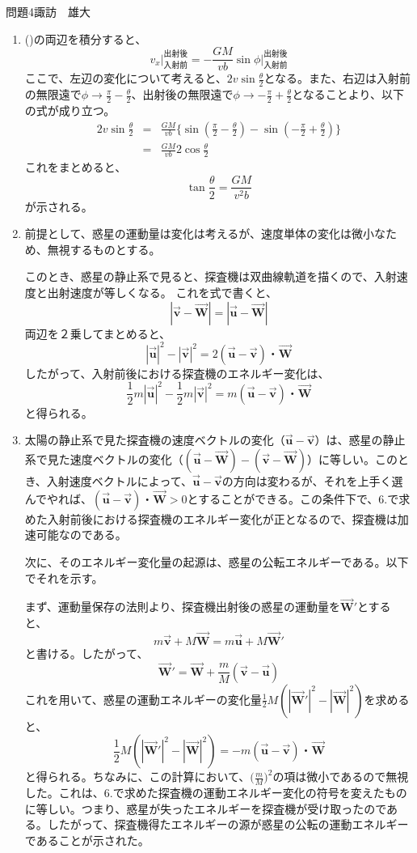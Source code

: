 \documentclass[fleqn]{jbook}
\newcommand{\W}{\vec{\mathbf{W}}} %
\newcommand{\vu}{\vec{\mathbf{u}}} %
\newcommand{\vv}{\vec{\mathbf{v}}} %
\begin{document}
\begin{answer}{問題4}{諏訪　雄大}
\begin{enumerate}
\begin{eqnarray*}
	\end{eqnarray*}
	したがって、
	\[
	dv_x=-\frac{GM}{vb}\cos\phi d\phi
	\]
	が示された。
\item ()の両辺を積分すると、
	\[
	v_x\bigg|_{入射前}^{出射後}=-\frac{GM}{vb}\sin\phi\bigg|_{入射前}^{出射後}
	\]
	ここで、左辺の変化について考えると、$2v\sin\frac{\theta}{2}$となる。また、右辺は入射前の無限遠で$\phi\to \frac{\pi}{2}-\frac{\theta}{2}$、出射後の無限遠で$\phi\to -\frac{\pi}{2}+\frac{\theta}{2}$となることより、以下の式が成り立つ。
	\begin{eqnarray*}
	2v\sin\frac{\theta}{2}&=&\frac{GM}{vb}\{\sin(\frac{\pi}{2}-\frac{\theta}{2})-\sin(-\frac{\pi}{2}+\frac{\theta}{2})\}\\
	&=&\frac{GM}{vb}2\cos\frac{\theta}{2}
	\end{eqnarray*}
	これをまとめると、
	\[
	\tan\frac{\theta}{2}=\frac{GM}{v^2b}
	\]
	が示される。
	\item 前提として、惑星の運動量は変化は考えるが、速度単体の変化は微小なため、無視するものとする。
	
	このとき、惑星の静止系で見ると、探査機は双曲線軌道を描くので、入射速度と出射速度が等しくなる。
	これを式で書くと、
	\[
	|\vv-\W|=|\vu-\W|
	\]
	両辺を２乗してまとめると、
	\[
	|\vu|^2-|\vv|^2=2(\vu-\vv)・\W
	\]
	したがって、入射前後における探査機のエネルギー変化は、
	\[
	\frac{1}{2}m|\vu|^2-\frac{1}{2}m|\vv|^2=m(\vu-\vv)・\W
	\]
	と得られる。
	\item 太陽の静止系で見た探査機の速度ベクトルの変化（$\vu-\vv$）は、惑星の静止系で見た速度ベクトルの変化（$(\vu-\W)-(\vv-\W)$）に等しい。このとき、入射速度ベクトルによって、$\vu-\vv$の方向は変わるが、それを上手く選んでやれば、$(\vu-\vv)・\W>0$とすることができる。この条件下で、6.で求めた入射前後における探査機のエネルギー変化が正となるので、探査機は加速可能なのである。
	
	次に、そのエネルギー変化量の起源は、惑星の公転エネルギーである。以下でそれを示す。
	
	まず、運動量保存の法則より、探査機出射後の惑星の運動量を$\W'$とすると、
	\[
	m\vv+M\W=m\vu+M\W'
	\]
	と書ける。したがって、
	\[
	\W'=\W+\frac{m}{M}(\vv-\vu)
	\]
	これを用いて、惑星の運動エネルギーの変化量$\frac{1}{2}M(|\W'|^2-|\W|^2)$を求めると、
	\[
	\frac{1}{2}M(|\W'|^2-|\W|^2)=-m(\vu-\vv)・\W
	\]
	と得られる。ちなみに、この計算において、$\big(\frac{m}{M}\big)^2$の項は微小であるので無視した。これは、6.で求めた探査機の運動エネルギー変化の符号を変えたものに等しい。つまり、惑星が失ったエネルギーを探査機が受け取ったのである。したがって、探査機得たエネルギーの源が惑星の公転の運動エネルギーであることが示された。
\end{enumerate}
\end{answer}
\end{document}
